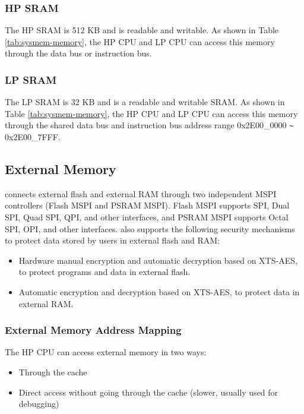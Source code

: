 \documentclass[main\_\_EN.tex]{subfiles}
\begin{document}
\subsubsection{HP SRAM}
\label{other:sysmem-internal-sram-0}

The HP SRAM is 512 KB and is readable and writable. As shown in Table \ref{tab:sysmem-memory}, the HP CPU and LP CPU can access this memory through the data bus or instruction bus.


\subsubsection{LP SRAM}

The LP SRAM is 32 KB and is a readable and writable SRAM. As shown in Table \ref{tab:sysmem-memory}, the HP CPU and LP CPU can access this memory through the shared data bus and instruction bus address range 0x2E00\_0000 \verb+~+ 0x2E00\_7FFF.


\subsection{External Memory}
\label{para:sysmem-external-memory}

\chipname{} connects external flash and external RAM through two independent MSPI controllers (Flash MSPI and PSRAM MSPI). Flash MSPI supports SPI, Dual SPI, Quad SPI, QPI, and other interfaces, and PSRAM MSPI supports Octal SPI, OPI, and other interfaces. \chipname{} also supports the following security mechanisms to protect data stored by users in external flash and RAM:
\begin{itemize}
    \item Hardware manual encryption and automatic decryption based on XTS-AES, to protect programs and data in external flash.
    \item Automatic encryption and decryption based on XTS-AES, to protect data in external RAM.
\end{itemize}


\subsubsection{External Memory Address Mapping}

The HP CPU can access external memory in two ways:
\begin{itemize}
    \item Through the cache
    \item Direct access without going through the cache (slower, usually used for debugging)
\end{itemize}
\end{document}
